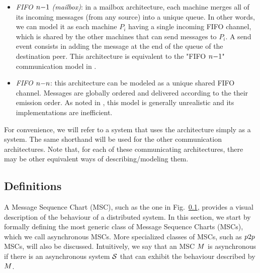 \documentclass{article}
\begin{document}
\begin{itemize}
	\item \emph{FIFO $n\mathsf{-}1$ (mailbox)}: in a mailbox architecture, each machine merges all of its incoming messages (from any source) into a unique queue. In other words, we can model it as each machine $P_i$ having a single incoming FIFO channel, which is shared by the other machines that can send messages to $P_i$. A send event consists in adding the message at the end of the queue of the destination peer. This architecture is equivalent to the "FIFO $n\mathsf{-}1$" communication model in \cite{DBLP:journals/fac/ChevrouHQ16}.
	\item \emph{FIFO $n\mathsf{-}n$}: this architecture can be modeled as a unique shared FIFO channel. Messages are globally ordered and delivered according to the their emission order. As noted in \cite{DBLP:journals/fac/ChevrouHQ16}, this model is generally unrealistic and its implementations are inefficient.

\end{itemize}
For convenience, we will refer to a system that uses the \pp architecture simply as a \pp system. The same shorthand will be used for the other communication architectures. Note that, for each of these communicating architectures, there may be other equivalent ways of describing/modeling them.

\subsection{Definitions}

A Message Sequence Chart (MSC), such as the one in Fig.~\ref{}, provides a visual description of the behaviour of a distributed system. In this section, we start by formally defining the most generic class of Message Sequence Charts (MSCs), which we call asynchronous MSCs. More specialized classes of MSCs, such as $p2p$ MSCs, will also be discussed. Intuitively, we say that an MSC $M$ is asynchronous if there is an asynchronous system $\mathcal{S}$ that can exhibit the behaviour described by $M$. 
\end{document}
